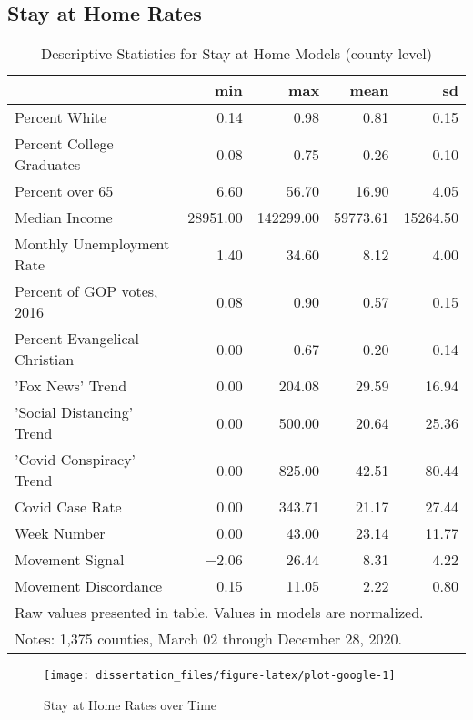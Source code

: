 \hypertarget{stay-at-home-rates}{%
\subsection{Stay at Home Rates}\label{stay-at-home-rates}}

\begin{table}[!h]

\caption{\label{tab:google-desc-table}Descriptive Statistics for Stay-at-Home Models (county-level)}
\centering
\begin{tabular}[t]{lrrrr}
\toprule
  & min & max & mean & sd\\
\midrule
Percent White & \num{0.14} & \num{0.98} & \num{0.81} & \num{0.15}\\
Percent College Graduates & \num{0.08} & \num{0.75} & \num{0.26} & \num{0.10}\\
Percent over 65 & \num{6.60} & \num{56.70} & \num{16.90} & \num{4.05}\\
Median Income & \num{28951.00} & \num{142299.00} & \num{59773.61} & \num{15264.50}\\
Monthly Unemployment Rate & \num{1.40} & \num{34.60} & \num{8.12} & \num{4.00}\\
Percent of GOP votes, 2016 & \num{0.08} & \num{0.90} & \num{0.57} & \num{0.15}\\
Percent Evangelical Christian & \num{0.00} & \num{0.67} & \num{0.20} & \num{0.14}\\
'Fox News' Trend & \num{0.00} & \num{204.08} & \num{29.59} & \num{16.94}\\
'Social Distancing' Trend & \num{0.00} & \num{500.00} & \num{20.64} & \num{25.36}\\
'Covid Conspiracy' Trend & \num{0.00} & \num{825.00} & \num{42.51} & \num{80.44}\\
Covid Case Rate & \num{0.00} & \num{343.71} & \num{21.17} & \num{27.44}\\
Week Number & \num{0.00} & \num{43.00} & \num{23.14} & \num{11.77}\\
Movement Signal & \num{-2.06} & \num{26.44} & \num{8.31} & \num{4.22}\\
Movement Discordance & \num{0.15} & \num{11.05} & \num{2.22} & \num{0.80}\\
\bottomrule
\multicolumn{5}{l}{\rule{0pt}{1em}Raw values presented in table. Values in models are normalized.}\\
\multicolumn{5}{l}{\rule{0pt}{1em}Notes: 1,375 counties, March 02 through December 28, 2020.}\\
\end{tabular}
\end{table}
\begin{figure}

{\centering \texttt{[image: dissertation\_files/figure-latex/plot-google-1]} 

}

\caption{Stay at Home Rates over Time}\label{fig:plot-google}
\end{figure}

